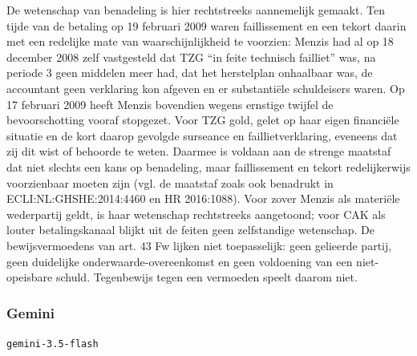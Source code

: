 \documentclass[
  dutch,
  a4paper,
]{article}
\begin{document}
De wetenschap van benadeling is hier rechtstreeks aannemelijk gemaakt. Ten tijde van de betaling op 19 februari 2009 waren faillissement en een tekort daarin met een redelijke mate van waarschijnlijkheid te voorzien: Menzis had al op 18 december 2008 zelf vastgesteld dat TZG ``in feite technisch failliet'' was, na periode 3 geen middelen meer had, dat het herstelplan onhaalbaar was, de accountant geen verklaring kon afgeven en er substantiële schuldeisers waren. Op 17 februari 2009 heeft Menzis bovendien wegens ernstige twijfel de bevoorschotting vooraf stopgezet. Voor TZG gold, gelet op haar eigen financiële situatie en de kort daarop gevolgde surseance en faillietverklaring, eveneens dat zij dit wist of behoorde te weten. Daarmee is voldaan aan de strenge maatstaf dat niet slechts een kans op benadeling, maar faillissement en tekort redelijkerwijs voorzienbaar moeten zijn (vgl. de maatstaf zoals ook benadrukt in ECLI:NL:GHSHE:2014:4460 en HR 2016:1088). Voor zover Menzis als materiële wederpartij geldt, is haar wetenschap rechtstreeks aangetoond; voor CAK als louter betalingskanaal blijkt uit de feiten geen zelfstandige wetenschap. De bewijsvermoedens van art. 43 Fw lijken niet toepasselijk: geen gelieerde partij, geen duidelijke onderwaarde-overeenkomst en geen voldoening van een niet-opeisbare schuld. Tegenbewijs tegen een vermoeden speelt daarom niet.

\newpage


\subsubsection{Gemini}\label{gemini-29}

\texttt{gemini-3.5-flash}
\end{document}
